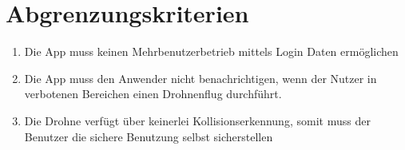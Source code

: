 \section{Abgrenzungskriterien}\label{sec:Abgrenzungskriterien}
\begin{enumerate}[label=\roman*.]
	\item Die App muss keinen Mehrbenutzerbetrieb mittels Login Daten ermöglichen
	\item Die App muss den Anwender nicht benachrichtigen, wenn der Nutzer in verbotenen Bereichen einen Drohnenflug durchführt.
	\item Die Drohne verfügt über keinerlei Kollisionserkennung, somit muss der Benutzer die sichere Benutzung selbst sicherstellen
		
\end{enumerate}